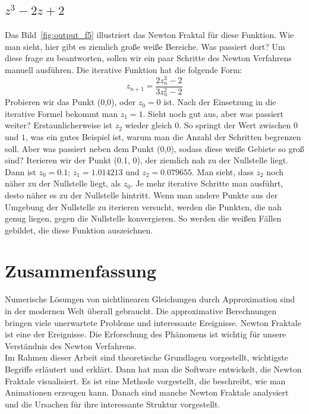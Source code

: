 \documentclass[a4paper,12pt]{llncs}
\numberwithin{equation}{section}
\begin{document}
\subsection{$z^3 - 2z + 2$}
Das Bild~\ref{fig:output_f5} illustriert das Newton Fraktal für diese Funktion.
Wie man sieht, hier gibt es ziemlich große weiße Bereiche. 
Was passiert dort?
Um diese frage zu beantworten, sollen wir ein paar Schritte des Newton Verfahrens manuell ausführen.
Die iterative Funktion hat die folgende Form:
\[
z_{n+1} = \frac{2z_n^3-2}{3z_n^2-2}
\]
Probieren wir das Punkt (0,0), oder $z_0 = 0$ ist.
Nach der Einsetzung in die iterative Formel bekommt man $z_1 = 1$.
Sieht noch gut aus, aber was passiert weiter?
Erstaunlicherweise ist $z_2$ wieder gleich $0$.
So springt der Wert zwischen $0$ und $1$, was ein gutes Beispiel ist, warum man die Anzahl der Schritten begrenzen soll.
Aber was passiert neben dem Punkt (0,0), sodass diese weiße Gebiete so groß sind?
Iterieren wir der Punkt (0.1, 0), der ziemlich nah zu der Nullstelle liegt.
Dann ist $z_0=0.1$; $z_1= 1.014213$ und $z_2= 0.079655$.
Man sieht, dass $z_2$ noch näher zu der Nullstelle liegt, als $z_0$.
Je mehr iterative Schritte man ausführt, desto näher es zu der Nullstelle hintritt.
Wenn man andere Punkte aus der Umgebung der Nullstelle zu iterieren versucht, werden die Punkten, die nah genug liegen, gegen die Nullstelle konvergieren.
So werden die weißen Fällen gebildet, die diese Funktion auszeichnen.

\section{Zusammenfassung}
Numerische Lösungen von nichtlinearen Gleichungen durch Approximation sind in der modernen Welt überall gebraucht.
Die approximative Berechnungen bringen viele unerwartete Probleme und interessante Ereignisse.
Newton Fraktale ist eine der Ereignisse. 
Die Erforschung des Phänomens ist wichtig für unsere Verständnis des Newton Verfahrens.\\
Im Rahmen dieser Arbeit sind theoretische Grundlagen vorgestellt, wichtigste Begriffe erläutert und erklärt.
Dann hat man die Software entwickelt, die Newton Fraktale visualisiert.
Es ist eine Methode vorgestellt, die beschreibt, wie man Animationen erzeugen kann.
Danach sind manche Newton Fraktale analysiert und die Ursachen für ihre interessante Struktur vorgestellt.
\newpage

 

\end{document}
